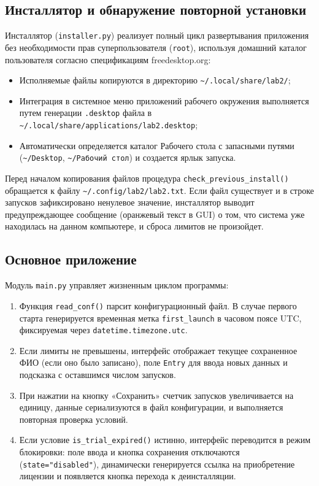 \documentclass[a4paper]{article}
\begin{document}
\subsection{Инсталлятор и обнаружение повторной установки}
Инсталлятор (\texttt{installer.py}) реализует полный цикл развертывания приложения без необходимости прав суперпользователя (\texttt{root}), используя домашний каталог пользователя согласно спецификациям freedesktop.org:
\begin{itemize}
    \item Исполняемые файлы копируются в директорию \texttt{\textasciitilde/.local/share/lab2/};
    \item Интеграция в системное меню приложений рабочего окружения выполняется путем генерации \texttt{.desktop} файла в \texttt{\textasciitilde/.local/share/applications/lab2.desktop};
    \item Автоматически определяется каталог Рабочего стола с запасными путями (\texttt{\textasciitilde/Desktop}, \texttt{\textasciitilde/Рабочий стол}) и создается ярлык запуска.
\end{itemize}

Перед началом копирования файлов процедура \texttt{check\_previous\_install()} обращается к файлу \texttt{\textasciitilde/.config/lab2/lab2.txt}. Если файл существует и в строке запусков зафиксировано ненулевое значение, инсталлятор выводит предупреждающее сообщение (оранжевый текст в GUI) о том, что система уже находилась на данном компьютере, и сброса лимитов не произойдет.

\subsection{Основное приложение}
Модуль \texttt{main.py} управляет жизненным циклом программы:
\begin{enumerate}
    \item Функция \texttt{read\_conf()} парсит конфигурационный файл. В случае первого старта генерируется временная метка \texttt{first\_launch} в часовом поясе UTC, фиксируемая через \texttt{datetime.timezone.utc}.
    \item Если лимиты не превышены, интерфейс отображает текущее сохраненное ФИО (если оно было записано), поле \texttt{Entry} для ввода новых данных и подсказка с оставшимся числом запусков.
    \item При нажатии на кнопку «Сохранить» счетчик запусков увеличивается на единицу, данные сериализуются в файл конфигурации, и выполняется повторная проверка условий.
    \item Если условие \texttt{is\_trial\_expired()} истинно, интерфейс переводится в режим блокировки: поле ввода и кнопка сохранения отключаются (\texttt{state="disabled"}), динамически генерируется ссылка на приобретение лицензии и появляется кнопка перехода к деинсталляции.
\end{enumerate}
\end{document}

